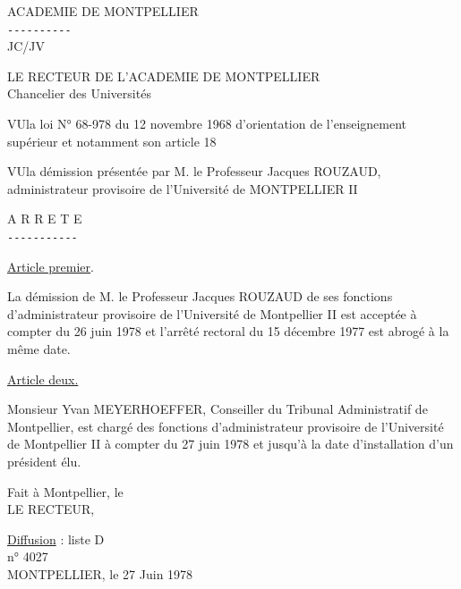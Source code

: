 ACADEMIE DE MONTPELLIER\\
\texttt{-{}-{}-{}-{}-{}-{}-{}-{}-{}-}\\
JC/JV

LE RECTEUR DE L'ACADEMIE DE MONTPELLIER\\
Chancelier des Universités

VU\quad la loi N° 68-978 du 12 novembre 1968 d'orientation de l'enseignement supérieur et notamment son article 18

VU\quad la démission présentée par M. le Professeur Jacques ROUZAUD, administrateur provisoire de l'Université de MONTPELLIER II

\begin{center}A R R E T E\\
\texttt{-{}-{}-{}-{}-{}-{}-{}-{}-{}-{}-}\end{center}

\uline{Article premier}.

La démission de M. le Professeur Jacques ROUZAUD de ses fonctions d'administrateur provisoire de l'Université de Montpellier II est acceptée à compter du 26 juin 1978 et l'arrêté rectoral du 15 décembre 1977 est abrogé à la même date.

\uline{Article deux.}

Monsieur Yvan MEYERHOEFFER, Conseiller du Tribunal Administratif de Montpellier, est chargé des fonctions d'administrateur provisoire de l'Université de Montpellier II à compter du 27 juin 1978 et jusqu'à la date d'installation d'un président élu.

Fait à Montpellier, le \\
LE RECTEUR,\\

\uline{Diffusion} : liste D\\
n° 4027\\
MONTPELLIER, le 27 Juin 1978

